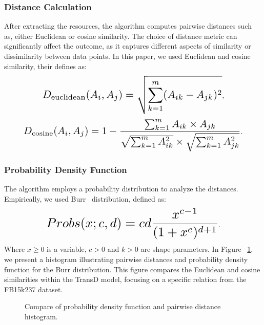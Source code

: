 \documentclass{article}
\begin{document}
\subsubsection{Distance Calculation}
After extracting the resources, the algorithm computes pairwise distances such as, either Euclidean or cosine similarity. The choice of distance metric can significantly affect the outcome, as it captures different aspects of similarity or dissimilarity between data points. In this paper, we used Euclidean and cosine similarity, their defines as:
\begin{equation}
    \resizebox{.73\linewidth}{!}{$
            \displaystyle
            D_{\text{euclidean}}(A_i, A_j) = \sqrt{\sum_{k=1}^{m}(A_{ik} - A_{jk})^2}
        $},
\end{equation}
\begin{equation}
    \resizebox{.88\linewidth}{!}{$
            \displaystyle
            D_{\text{cosine}}(A_i, A_j) = 1 - \frac{\sum_{k=1}^{m}A_{ik} \times A_{jk}}{\sqrt{\sum_{k=1}^{m}A_{ik}^2} \times \sqrt{\sum_{k=1}^{m}A_{jk}^2}}
        $}.
\end{equation}

\subsubsection{Probability Density Function}
The algorithm employs a probability distribution to analyze the distances. Empirically, we used Burr~\cite{burr1942cumulative} distribution, defined as:  
\begin{equation}
    \resizebox{.70\linewidth}{!}{$
            \displaystyle
            Probs(x; c, d) = cd \frac{x^{c-1}}{(1 + x^c)^{d+1}}
        $}.
\end{equation} Where \( x \geq 0 \) is a variable, \( c > 0 \) and \( k > 0 \) are shape parameters. In Figure ~\ref{fig:pdfhist}, we present a histogram illustrating pairwise distances and probability density function for the Burr distribution. This figure compares the Euclidean and cosine similarities within the TransD model, focusing on a specific relation from the FB15k237 dataset.


\bgroup
\begin{figure}[!tb]
  \centering \makeatletter{}
  \makeatother
  \caption{{Compare of probability density function and pairwise distance histogram.}}
  \label{fig:pdfhist}
  \hfill
\end{figure}
\egroup
\end{document}
